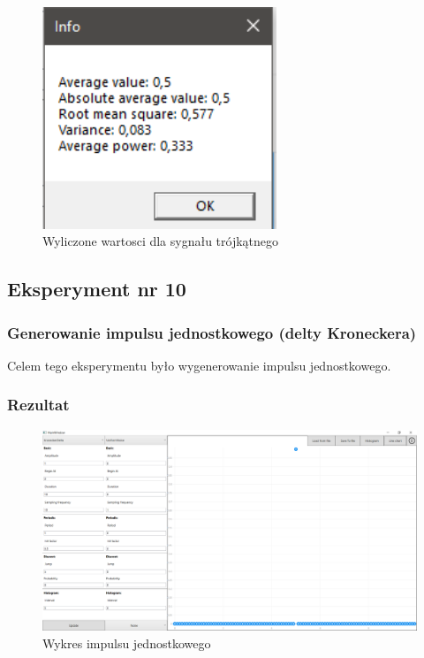 \documentclass[12pt]{article}
\begin{document}
\begin{figure}[H]
 \centering
 \includegraphics[width=7cm]{images/trian1info.PNG}
 \vspace{-0.3cm}
 \caption{Wyliczone wartosci dla sygnału trójkątnego}
 \label{gui}
\end{figure}



\subsection{Eksperyment nr 10 }
\subsubsection{Generowanie impulsu jednostkowego (delty Kroneckera) }
Celem tego eksperymentu było wygenerowanie impulsu jednostkowego.


\subsubsection{Rezultat}

\begin{figure}[H]
 \centering
 \includegraphics[width=14cm]{images/kron1.PNG}
 \vspace{-0.3cm}
 \caption{Wykres impulsu jednostkowego}
 \label{gui}
\end{figure}
\end{document}
